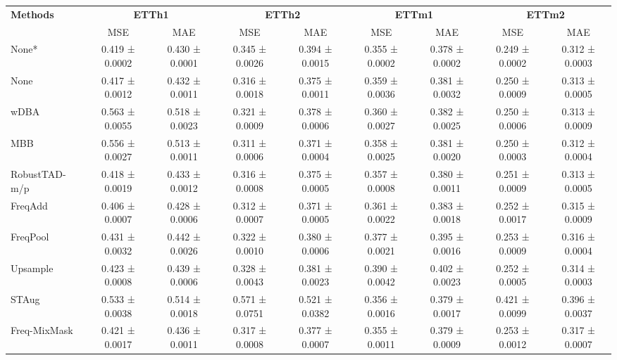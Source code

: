 \begin{table}[h!]
\centering
\vspace{0.2cm}
\renewcommand{\arraystretch}{1.3}
\begin{adjustbox}{max width=\textwidth}
\begin{tabular}{l|cc|cc|cc|cc}
    \toprule
    \textbf{Methods} & \multicolumn{2}{c|}{\textbf{ETTh1}} & \multicolumn{2}{c|}{\textbf{ETTh2}} & \multicolumn{2}{c|}{\textbf{ETTm1}} & \multicolumn{2}{c}{\textbf{ETTm2}} \\
    & MSE & MAE & MSE & MAE & MSE & MAE & MSE & MAE \\
    \midrule
    None* & 0.419 ± 0.0002 & 0.430 ± 0.0001 & 0.345 ± 0.0026 & 0.394 ± 0.0015 & 0.355 ± 0.0002 & 0.378 ± 0.0002 & 0.249 ± 0.0002 & 0.312 ± 0.0003 \\
        None         & 0.417 ± 0.0012 & 0.432 ± 0.0011 & 0.316 ± 0.0018 & 0.375 ± 0.0011 & 0.359 ± 0.0036 & 0.381 ± 0.0032 & 0.250 ± 0.0009 & 0.313 ± 0.0005 \\
        wDBA          & 0.563 ± 0.0055 & 0.518 ± 0.0023 & 0.321 ± 0.0009 & 0.378 ± 0.0006 & 0.360 ± 0.0027 & 0.382 ± 0.0025 & 0.250 ± 0.0006 & 0.313 ± 0.0009 \\
        MBB          & 0.556 ± 0.0027 & 0.513 ± 0.0011 & \cellcolor{secondcolor}0.311 ± 0.0006 & 0.371 ± 0.0004 & 0.358 ± 0.0025 & 0.381 ± 0.0020 & 0.250 ± 0.0003 & \cellcolor{secondcolor}0.312 ± 0.0004 \\
        RobustTAD-m/p  & 0.418 ± 0.0019 & 0.433 ± 0.0012 & 0.316 ± 0.0008 & 0.375 ± 0.0005 & 0.357 ± 0.0008 & 0.380 ± 0.0011 & 0.251 ± 0.0009 & 0.313 ± 0.0005 \\
        FreqAdd      & 0.406 ± 0.0007 & 0.428 ± 0.0006 & 0.312 ± 0.0007 & \cellcolor{secondcolor}0.371 ± 0.0005 & 0.361 ± 0.0022 & 0.383 ± 0.0018 & 0.252 ± 0.0017 & 0.315 ± 0.0009  \\
        FreqPool     & 0.431 ± 0.0032 & 0.442 ± 0.0026 & 0.322 ± 0.0010 & 0.380 ± 0.0006 & 0.377 ± 0.0021 & 0.395 ± 0.0016 & 0.253 ± 0.0009 & 0.316 ± 0.0004 \\
        Upsample     & 0.423 ± 0.0008 & 0.439 ± 0.0006 & 0.328 ± 0.0043 & 0.381 ± 0.0023 & 0.390 ± 0.0042 & 0.402 ± 0.0023 & 0.252 ± 0.0005 & 0.314 ± 0.0003  \\
        STAug        & 0.533 ± 0.0038 & 0.514 ± 0.0018 & 0.571 ± 0.0751 & 0.521 ± 0.0382 & 0.356 ± 0.0016 & 0.379 ± 0.0017 & 0.421 ± 0.0099 & 0.396 ± 0.0037  \\
        Freq-MixMask & 0.421 ± 0.0017 & 0.436 ± 0.0011 & 0.317 ± 0.0008 & 0.377 ± 0.0007 & 0.355 ± 0.0011 & \cellcolor{secondcolor}0.379 ± 0.0009 & 0.253 ± 0.0012 & 0.317 ± 0.0007  \\

\end{tabular}
\end{adjustbox}
\end{table}
